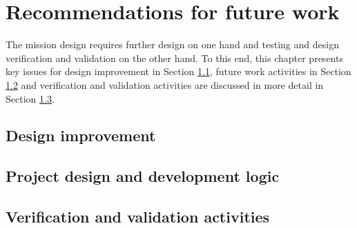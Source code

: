 \section{Recommendations for future work}\label{cha:futurework}
The mission design requires further design on one hand and testing and design verification and validation on the other hand. To this end, this chapter presents key issues for design improvement in Section \ref{sec:improve}, future work activities in Section \ref{sec:danddlogic} and verification and validation activities are discussed in more detail in Section \ref{sec:futurevandv}.

\subsection{Design improvement} \label{sec:improve}


\subsection{Project design and development logic} \label{sec:danddlogic}


%

\subsection{Verification and validation activities} \label{sec:futurevandv}

